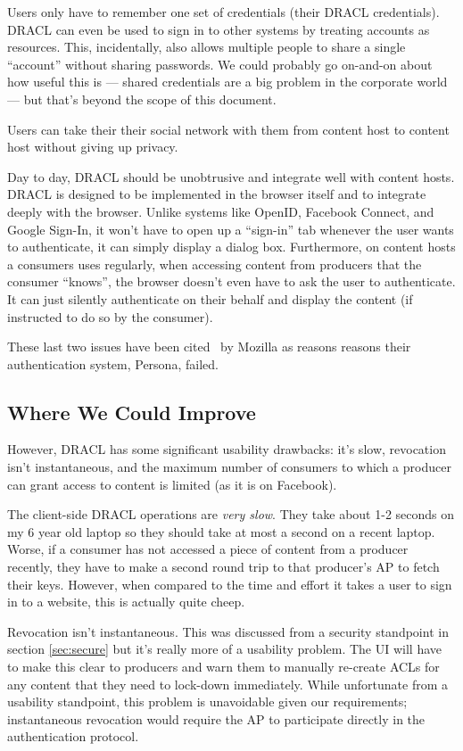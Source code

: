\documentclass[pdftex,12pt,a4papaer,twoside,notitlepage]{report}
\begin{document}
Users only have to remember one set of credentials (their DRACL credentials).
DRACL can even be used to sign in to other systems by treating accounts as
resources. This, incidentally, also allows multiple people to share a single
``account'' without sharing passwords. We could probably go on-and-on about how
useful this is --- shared credentials are a big problem in the corporate world
--- but that's beyond the scope of this document.

Users can take their their social network with them from content host to content
host without giving up privacy.

Day to day, DRACL should be unobtrusive and integrate well with content hosts.
DRACL is designed to be implemented in the browser itself and to integrate
deeply with the browser. Unlike systems like OpenID, Facebook Connect, and
Google Sign-In, it won't have to open up a ``sign-in'' tab whenever the user
wants to authenticate, it can simply display a dialog box. Furthermore, on
content hosts a consumers uses regularly, when accessing content from producers
that the consumer ``knows'', the browser doesn't even have to ask the user to
authenticate. It can just silently authenticate on their behalf and display the
content (if instructed to do so by the consumer).

These last two issues have been cited~\cite{persona-fail} by Mozilla as reasons
reasons their authentication system, Persona, failed.

\subsection{Where We Could Improve}
\label{sec:usability_improve}

However, DRACL has some significant usability drawbacks: it's slow, revocation
isn't instantaneous, and the maximum number of consumers to which a producer can
grant access to content is limited (as it is on Facebook).

The client-side DRACL operations are \emph{very slow}. They take about 1-2
seconds on my 6 year old laptop so they should take at most a second on a recent
laptop. Worse, if a consumer has not accessed a piece of content from a producer
recently, they have to make a second round trip to that producer's AP to fetch
their keys. However, when compared to the time and effort it takes a user to
sign in to a website, this is actually quite cheep.

Revocation isn't instantaneous. This was discussed from a security standpoint in
section \cref{sec:secure} but it's really more of a usability problem. The UI
will have to make this clear to producers and warn them to manually re-create
ACLs for any content that they need to lock-down immediately. While unfortunate
from a usability standpoint, this problem is unavoidable given our requirements;
instantaneous revocation would require the AP to participate directly in the
authentication protocol.
\end{document}
